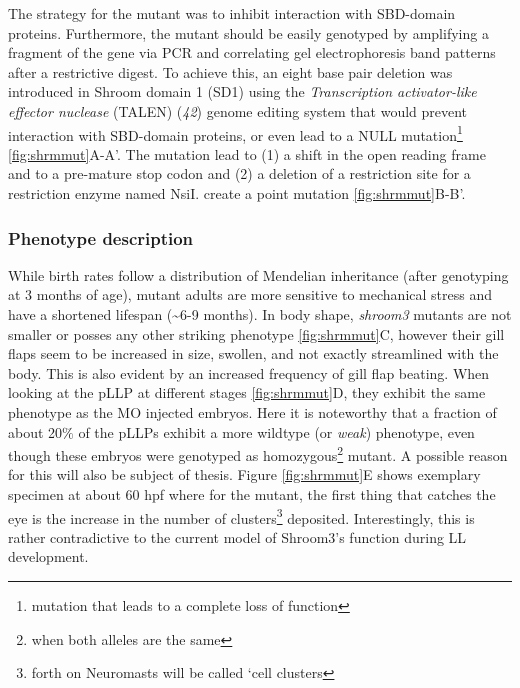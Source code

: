 \documentclass[11pt,singlespacinge,twoside]{reedthesis} %
\begin{document}
The strategy for the mutant was to inhibit interaction with SBD-domain proteins. Furthermore, the mutant should be easily genotyped by amplifying a fragment of the gene via PCR and correlating gel electrophoresis band patterns after a restrictive digest. To achieve this, an eight base pair deletion was introduced in Shroom domain 1 (SD1) using the \emph{Transcription activator-like effector nuclease} (TALEN) (\emph{42}) genome editing system that would prevent interaction with SBD-domain proteins, or even lead to a NULL mutation\footnote{mutation that leads to a complete loss of function} \ref{fig:shrmmut}A-A'. The mutation lead to (1) a shift in the open reading frame and to a pre-mature stop codon and (2) a deletion of a restriction site for a restriction enzyme named NsiI. create a point mutation \ref{fig:shrmmut}B-B'.

\hypertarget{intro-phen}{%
\subsubsection{Phenotype description}\label{intro-phen}}

While birth rates follow a distribution of Mendelian inheritance (after genotyping at 3 months of age), mutant adults are more sensitive to mechanical stress and have a shortened lifespan (\textasciitilde{}6-9 months). In body shape, \emph{shroom3} mutants are not smaller or posses any other striking phenotype \ref{fig:shrmmut}C, however their gill flaps seem to be increased in size, swollen, and not exactly streamlined with the body. This is also evident by an increased frequency of gill flap beating. When looking at the pLLP at different stages \ref{fig:shrmmut}D, they exhibit the same phenotype as the MO injected embryos. Here it is noteworthy that a fraction of about 20\(\%\) of the pLLPs exhibit a more wildtype (or \emph{weak}) phenotype, even though these embryos were genotyped as homozygous\footnote{when both alleles are the same} mutant. A possible reason for this will also be subject of thesis. Figure \ref{fig:shrmmut}E shows exemplary specimen at about 60 hpf where for the mutant, the first thing that catches the eye is the increase in the number of clusters\footnote{forth on Neuromasts will be called `cell clusters} deposited. Interestingly, this is rather contradictive to the current model of Shroom3's function during LL development.
\end{document}
